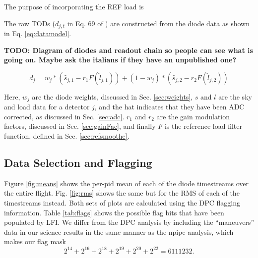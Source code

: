 \documentclass[twocolumn]{aa}
\begin{document}
The purpose of incorporating the REF load is 

The raw TODs ($d_{j,t}$ in Eq. 69 of \citet{BP01}) are constructed from the diode data as shown in Eq. \ref{eq:datamodel}.

\textbf{TODO: Diagram of diodes and readout chain so people can see what is going on. Maybe ask the italians if they have an unpublished one?}


\begin{equation}
\label{eq:datamodel}
d_j = w_j * (\hat{s}_{j,1} - r_1 F(\hat{l}_{j,1})) + (1-w_j)*(\hat{s}_{j,2} - r_2 F(\hat{l}_{j,2}))
\end{equation}

Here, $w_j$ are the diode weights, discussed in Sec. \ref{sec:weights}, $s$ and $l$ are the sky and load data for a detector $j$, and the hat indicates that they have been ADC corrected, as discussed in Sec. \ref{sec:adc}. $r_1$ and $r_2$ are the gain modulation factors, discussed in Sec. \ref{sec:gainFac}, and finally $F$ is the reference load filter function, defined in Sec. \ref{sec:refsmoothe}.

\subsection{Data Selection and Flagging}

Figure \ref{fig:means} shows the per-pid mean of each of the diode timestreams over the entire flight. Fig. \ref{fig:rms} shows the same but for the RMS of each of the timestreams instead. Both sets of plots are calculated using the DPC flagging information. Table \ref{tab:flags} shows the possible flag bits that have been populated by LFI. We differ from the DPC analysis by including the ``maneuvers'' data in our science results in the same manner as the npipe analysis, which makes our flag mask 
\begin{equation}
 2^{14} + 2^{16} + 2^{18} + 2^{19} + 2^{20} + 2^{22} = 6111232. 
\end{equation}
\end{document}
